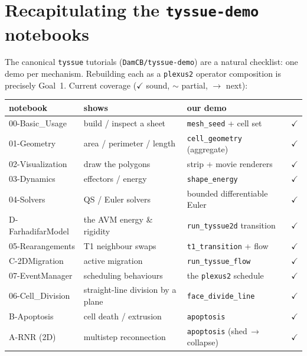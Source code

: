 \documentclass[11pt]{article}
\begin{document}
\section{Recapitulating the \texttt{tyssue-demo} notebooks}
The canonical \texttt{tyssue} tutorials (\texttt{DamCB/tyssue-demo}) are a natural checklist: one
demo per mechanism. Rebuilding each as a \texttt{plexus2} operator composition is precisely
Goal~1. Current coverage ($\checkmark$ sound, $\sim$ partial, $\rightarrow$ next):

\begin{center}
\small
\renewcommand{\arraystretch}{1.15}
\begin{tabular}{@{}p{3.9cm}p{4.7cm}p{3.5cm}c@{}}
\toprule
\textbf{notebook} & \textbf{shows} & \textbf{our demo} & \\
\midrule
00-Basic\_Usage       & build / inspect a sheet          & \texttt{mesh\_seed} + cell set        & $\checkmark$ \\
01-Geometry           & area / perimeter / length        & \texttt{cell\_geometry} (aggregate)   & $\checkmark$ \\
02-Visualization      & draw the polygons                & strip + movie renderers               & $\checkmark$ \\
03-Dynamics           & effectors / energy               & \texttt{shape\_energy}                & $\checkmark$ \\
04-Solvers            & QS / Euler solvers               & bounded differentiable Euler          & $\checkmark$ \\
D-FarhadifarModel     & the AVM energy \& rigidity        & \texttt{run\_tyssue2d} transition     & $\checkmark$ \\
05-Rearangements      & T1 neighbour swaps               & \texttt{t1\_transition} + flow        & $\checkmark$ \\
C-2DMigration         & active migration                 & \texttt{run\_tyssue\_flow}            & $\checkmark$ \\
07-EventManager       & scheduling behaviours            & the \texttt{plexus2} schedule         & $\checkmark$ \\
06-Cell\_Division     & straight-line division by a plane & \texttt{face\_divide\_line}          & $\checkmark$ \\
B-Apoptosis           & cell death / extrusion           & \texttt{apoptosis}                    & $\checkmark$ \\
A-RNR (2D)            & multistep reconnection           & \texttt{apoptosis} (shed\,$\to$\,collapse) & $\checkmark$ \\
\bottomrule
\end{tabular}
\end{center}
\end{document}
